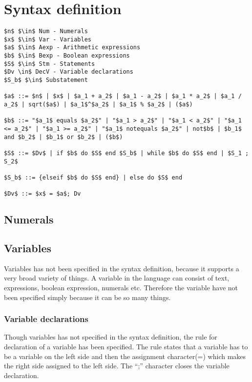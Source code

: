 \section{Syntax definition}\label{sec:anlysis:syntax-definition}
\begin{lstlisting}[mathescape, captionpos=b, caption={Syntax formation rules}, label={lst:syntax-formation}]
$n$ $\in$ Num - Numerals
$x$ $\in$ Var - Variables
$a$ $\in$ Aexp - Arithmetic expressions
$b$ $\in$ Bexp - Boolean expressions
$S$ $\in$ Stm - Statements
$Dv \in$ DecV - Variable declarations
$S_b$ $\in$ Substatement

$a$ ::= $n$ | $x$ | $a_1 + a_2$ | $a_1 - a_2$ | $a_1 * a_2$ | $a_1 / a_2$ | sqrt($a$) | $a_1$^$a_2$ | $a_1$ % $a_2$ | ($a$)

$b$ ::= "$a_1$ equals $a_2$" | "$a_1 > a_2$" | "$a_1 < a_2$" | "$a_1 <= a_2$" | "$a_1 >= a_2$" | "$a_1$ notequals $a_2$" | not$b$ | $b_1$ and $b_2$ | $b_1$ or $b_2$ | ($b$)

$S$ ::= $Dv$ | if $b$ do $S$ end $S_b$ | while $b$ do $S$ end | $S_1 ; S_2$

$S_b$ ::= {elseif $b$ do $S$ end} | else do $S$ end

$Dv$ ::= $x$ = $a$; Dv
\end{lstlisting}

\subsection{Numerals}
\subsection{Variables}
Variables has not been specified in the syntax definition, because it supports a very broad variety of things. A variable in the language can consist of text, expressions, boolean expression, numerals etc. Therefore the variable have not been specified simply because it can be so many things.

\subsubsection{Variable declarations}\label{sec:analysis:syntax-definition:variable-declaration}
Though variables has not specified in the syntax definition, the rule for declaration of a variable has been specified. The rule states that a variable has to be a variable on the left side and then the assignment character(=) which makes the right side assigned to the left side. The ``;'' character closes the variable declaration.

